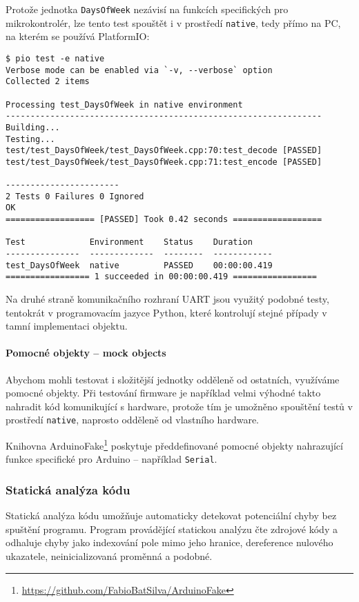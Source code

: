 Protože jednotka \texttt{DaysOfWeek} nezávisí na funkcích specifických pro
mikrokontrolér, lze tento test spouštět i v prostředí \texttt{native}, tedy
přímo na PC, na kterém se používá PlatformIO:
\begin{lstlisting}[style=terminal,columns=fixed]
$ pio test -e native
Verbose mode can be enabled via `-v, --verbose` option
Collected 2 items

Processing test_DaysOfWeek in native environment
----------------------------------------------------------------
Building...
Testing...
test/test_DaysOfWeek/test_DaysOfWeek.cpp:70:test_decode	[PASSED]
test/test_DaysOfWeek/test_DaysOfWeek.cpp:71:test_encode	[PASSED]

-----------------------
2 Tests 0 Failures 0 Ignored
OK
================== [PASSED] Took 0.42 seconds ==================

Test             Environment    Status    Duration
---------------  -------------  --------  ------------
test_DaysOfWeek  native         PASSED    00:00:00.419
================= 1 succeeded in 00:00:00.419 =================
\end{lstlisting}

Na druhé straně komunikačního rozhraní UART jsou využitý podobné testy,
tentokrát v programovacím jazyce Python, které kontrolují stejné případy
v tamní implementaci objektu.


\paragraph{Pomocné objekty -- mock objects}
Abychom mohli testovat i složitější jednotky odděleně od ostatních, využíváme
pomocné objekty. Při testování firmware je například velmi výhodné takto
nahradit kód komunikující s hardware, protože tím je umožněno spouštění testů
v prostředí \texttt{native}, naprosto odděleně od vlastního hardware.

Knihovna
ArduinoFake\footnote{\url{https://github.com/FabioBatSilva/ArduinoFake}}
poskytuje předdefinované pomocné objekty nahrazující funkce specifické pro
Arduino -- například \texttt{Serial}.


\subsubsection{Statická analýza kódu}
Statická analýza kódu umožňuje automaticky detekovat potenciální chyby bez
spuštění programu. Program provádějící statickou analýzu čte zdrojové kódy
a odhaluje chyby jako indexování pole mimo jeho hranice, dereference nulového
ukazatele, neinicializovaná proměnná a podobné.

